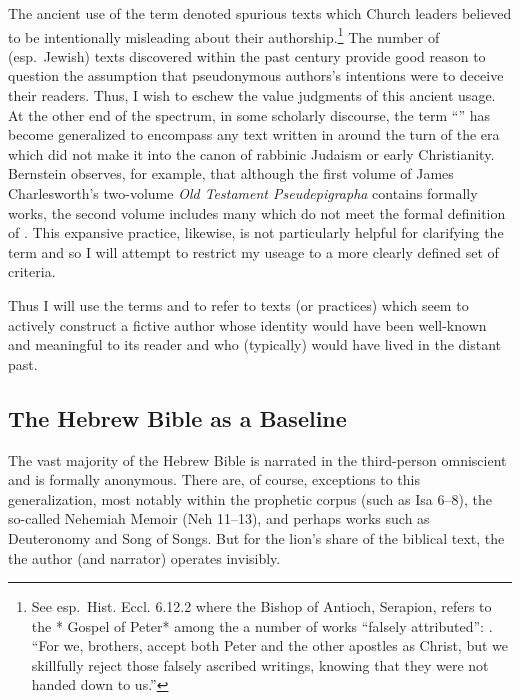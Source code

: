 The ancient use of the term \psa denoted spurious texts which Church leaders believed to be intentionally misleading about their authorship.\footnote{See esp.~Hist. Eccl. 6.12.2 where the Bishop of   Antioch, Serapion, refers to the * Gospel of Peter* among the a number   of works ``falsely attributed'': . ``For we, brothers, accept both Peter and the other   apostles as Christ, but we skillfully reject those falsely ascribed   writings, knowing that they were not handed down to us.''} The number of (esp.~Jewish) \psgraphical texts discovered within the past century provide good reason to question the assumption that pseudonymous authors's intentions were to deceive their readers.\autocites[53--58]{mroczek2016}[See also][]{reed_jts2009} Thus, I wish to eschew the value judgments of this ancient usage. At the other end of the spectrum, in some scholarly discourse, the term ``\psa'' has become generalized to encompass any text written in around the turn of the era which did not make it into the canon of rabbinic Judaism or early Christianity. Bernstein observes, for example, that although the first volume of James Charlesworth's two-volume \emph{Old Testament Pseudepigrapha} contains formally \psgraphic works, the second volume includes many which do not meet the formal definition of \psa.\autocites[2]{bernstein_chazon-etal1999}{charlesworth_OTP} This expansive practice, likewise, is not particularly helpful for clarifying the term and so I will attempt to restrict my useage to a more clearly defined set of criteria.

Thus I will use the terms \psy and \psa to refer to texts (or practices) which seem to actively construct a fictive author whose identity would have been well-known and meaningful to its reader and who (typically) would have lived in the distant past.

\subsection{The Hebrew Bible as a Baseline}

The vast majority of the Hebrew Bible is narrated in the third-person omniscient and is formally anonymous. There are, of course, exceptions to this generalization, most notably within the prophetic corpus (such as Isa 6--8), the so-called Nehemiah Memoir (Neh 11--13), and perhaps works such as Deuteronomy and Song of Songs. But for the lion's share of the biblical text, the the author (and narrator) operates invisibly.


